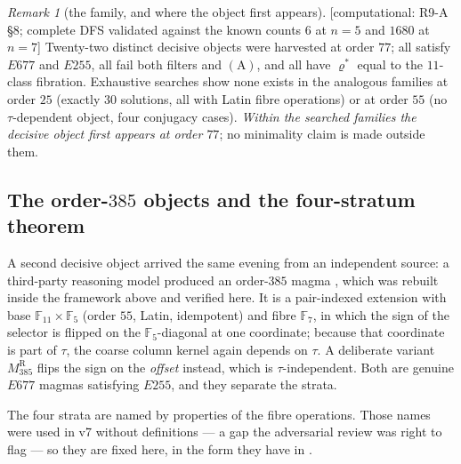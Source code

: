 \documentclass[11pt]{article}
\theoremstyle{plain}
\theoremstyle{definition}
\theoremstyle{remark}
\newtheorem*{remark*}{Remark}
\numberwithin{equation}{section}
\newcommand{\F}{\mathbb{F}}
\newcommand{\statusbox}[1]{{\small\sloppy\textsf{[#1]}}}
\newcommand{\COMP}[1]{\statusbox{computational: #1}}
\begin{document}
\begin{remark*}[the family, and where the object first appears]
\COMP{R9-A \S8; complete DFS validated against the known counts $6$ at $n=5$ and
$1680$ at $n=7$}
Twenty-two distinct decisive objects were harvested at order $77$; all satisfy
$E677$ and $E255$, all fail both filters and $(\mathrm{A})$, and all have
$\varrho^{*}$ equal to the $11$-class fibration. Exhaustive searches show none
exists in the analogous families at order $25$ (exactly $30$ solutions, all with
Latin fibre operations) or at order $55$ (no $\tau$-dependent object, four
conjugacy cases). \emph{Within the searched families the decisive object first
appears at order $77$}; no minimality claim is made outside them.
\end{remark*}

\subsection{The order-$385$ objects and the four-stratum theorem}\label{sec:strata}

A second decisive object arrived the same evening from an independent source: a
third-party reasoning model produced an order-$385$ magma \cite{R9gpt}, which was
rebuilt inside the framework above and verified here. It is a pair-indexed
extension with base $\F_{11}\times\F_5$ (order $55$, Latin, idempotent) and fibre
$\F_7$, in which the sign of the selector is flipped on the $\F_5$-diagonal at one
coordinate; because that coordinate is part of $\tau$, the coarse column kernel
again depends on $\tau$. A deliberate variant $M_{385}^{\mathrm{R}}$ flips the
sign on the \emph{offset} instead, which is $\tau$-independent. Both are genuine
$E677$ magmas satisfying $E255$, and they separate the strata.

The four strata are named by properties of the fibre operations. Those names
were used in v7 without definitions --- a gap the adversarial review was right to
flag --- so they are fixed here, in the form they have in \cite[\S B.2]{R9A}.
\end{document}
